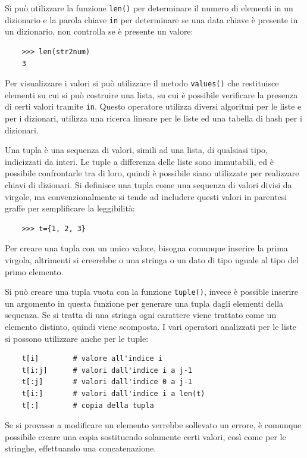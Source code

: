 \documentclass{article}
\numberwithin{equation}{subsection}
\begin{document}
Si può utilizzare la funzione \verb|len()| per determinare il numero di elementi in un dizionario e la parola chiave \verb|in| 
per determinare se una data chiave è presente in un dizionario, non controlla se è presente un valore:
\begin{verbatim}
    >>> len(str2num)
    3
\end{verbatim}
Per visualizzare i valori si può utilizzare il metodo \verb|values()| che restituisce elementi su cui si può costruire una lista, su cui è possibile 
verificare la presenza di certi valori tramite \verb|in|. Questo operatore utilizza diversi algoritmi per le liste e per i 
dizionari, utilizza una ricerca lineare per le liste ed una tabella di hash per i dizionari. 



Una tupla è una sequenza di valori, simili ad una lista, di qualsiasi tipo, indicizzati da interi. Le tuple a differenza delle liste 
sono immutabili, ed è possibile confrontarle tra di loro, quindi è possibile siano utilizzate per realizzare chiavi di 
dizionari. 
Si definisce una tupla come una sequenza di valori divisi da virgole, ma convenzionalmente si tende ad includere questi valori 
in parentesi graffe per semplificare la leggibilità:
\begin{verbatim}
    >>> t={1, 2, 3}
\end{verbatim}

Per creare una tupla con un unico valore, bisogna comunque inserire la prima virgola, altrimenti si creerebbe o una stringa o 
un dato di tipo uguale al tipo del primo elemento. 

Si può creare una tupla vuota con la funzione \verb|tuple()|, invece è possible inserire un argomento in questa funzione per 
generare una tupla dagli elementi della sequenza. Se si tratta di una stringa ogni carattere viene trattato come un 
elemento distinto, quindi viene scomposta. I vari operatori analizzati per le liste si possono utilizzare anche per le 
tuple:
\begin{verbatim}
    t[i]        # valore all'indice i
    t[i:j]      # valori dall'indice i a j-1
    t[:j]       # valori dall'indice 0 a j-1
    t[i:]       # valori dall'indice i a len(t)
    t[:]        # copia della tupla
\end{verbatim}

Se si provasse a modificare un elemento verrebbe sollevato un errore, è comunque possibile creare una copia sostituendo solamente 
certi valori, così come per le stringhe, effettuando una concatenazione. 
\end{document}
